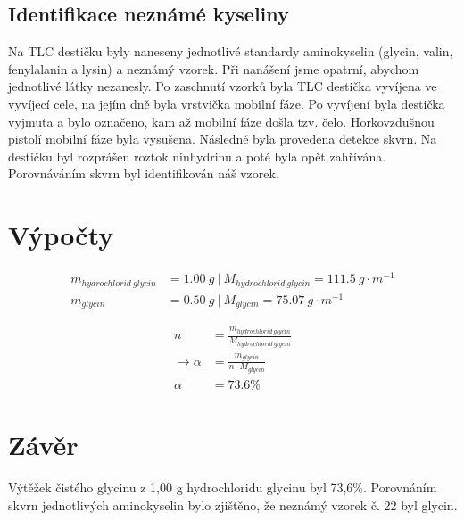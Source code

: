 \documentclass[13pt, a4paper, twoside]{article}
\begin{document}
    \subsection*{Identifikace neznámé kyseliny}
    Na TLC destičku byly naneseny jednotlivé standardy aminokyselin (glycin, valin, fenylalanin
    a lysin) a neznámý vzorek. Při nanášení jsme opatrní, abychom jednotlivé látky nezanesly.
    Po zaschnutí vzorků byla TLC destička vyvíjena ve vyvíjecí cele, na jejím dně byla vrstvička
    mobilní fáze. Po vyvíjení byla destička vyjmuta a bylo označeno, kam až mobilní fáze došla
    tzv. čelo. Horkovzdušnou pistolí mobilní fáze byla vysušena. Následně byla provedena
    detekce skvrn. Na destičku byl rozprášen roztok ninhydrinu a poté byla opět zahřívána.
    Porovnáváním skvrn byl identifikován náš vzorek.
    
    \section*{Výpočty}
        \begin{align*}
            m_{hydrochlorid\: glycin}&=1.00\: g \:|\: M_{hydrochlorid\: glycin}=111.5\: g\cdot m^{-1}\\
            m_{glycin}&=0.50\: g\:| \: M_{glycin}=75.07\: g\cdot m^{-1}
        \end{align*}


        \begin{align*}
            n&=\frac{m_{hydrochlorid\: glycin}}{M_{hydrochlorid\: glycin}}\\
            \to \alpha&=\frac{m_{glycin}}{n \cdot M_{glycin}}\\
            \alpha&=73.6\%
        \end{align*}
    \section*{Závěr}
    Výtěžek čistého glycinu z 1,00 g hydrochloridu glycinu byl 73,6\%.
    Porovnáním skvrn jednotlivých aminokyselin bylo zjištěno, že neznámý vzorek č. 22 byl
    glycin.
    
\end{document}
